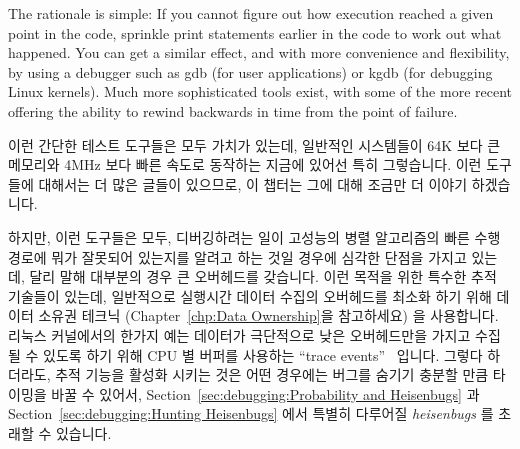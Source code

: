 The rationale is simple: If you cannot figure out how execution reached
a given point in the code, sprinkle print statements earlier in the
code to work out what happened.
You can get a similar effect, and with more convenience and flexibility,
by using a debugger such as gdb (for user applications) or kgdb
(for debugging Linux kernels).
Much more sophisticated tools exist, with some of the more recent
offering the ability to rewind backwards in time from the point
of failure.
\fi

이런 간단한 테스트 도구들은 모두 가치가 있는데, 일반적인 시스템들이 64K 보다 큰
메모리와 4MHz 보다 빠른 속도로 동작하는 지금에 있어선 특히 그렇습니다.
이런 도구들에 대해서는 더 많은 글들이 있으므로, 이 챕터는 그에 대해 조금만 더
이야기 하겠습니다.

하지만, 이런 도구들은 모두, 디버깅하려는 일이 고성능의 병렬 알고리즘의 빠른
수행경로에 뭐가 잘못되어 있는지를 알려고 하는 것일 경우에 심각한 단점을 가지고
있는데, 달리 말해 대부분의 경우 큰 오버헤드를 갖습니다.
이런 목적을 위한 특수한 추적 기술들이 있는데, 일반적으로 실행시간 데이터 수집의
오버헤드를 최소화 하기 위해 데이터 소유권 테크닉
(Chapter~\ref{chp:Data Ownership}을 참고하세요) 을 사용합니다.
리눅스 커널에서의 한가지 예는 데이터가 극단적으로 낮은 오버헤드만을 가지고
수집될 수 있도록 하기 위해 CPU 별 버퍼를 사용하는
``trace events''~\cite{StevenRostedt2010perfTraceEventP1,StevenRostedt2010perfTraceEventP2,StevenRostedt2010perfTraceEventP3,StevenRostedt2010perfHP+DeathlyMacros}
입니다.
그렇다 하더라도, 추적 기능을 활성화 시키는 것은 어떤 경우에는 버그를 숨기기
충분할 만큼 타이밍을 바꿀 수 있어서,
Section~\ref{sec:debugging:Probability and Heisenbugs} 과
Section~\ref{sec:debugging:Hunting Heisenbugs} 에서 특별히 다루어질
\emph{heisenbugs} 를 초래할 수 있습니다.

